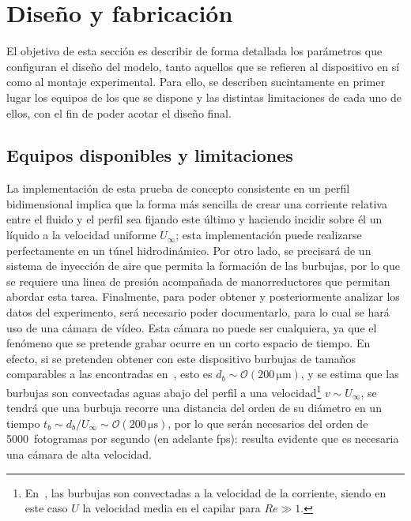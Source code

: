 \section{Diseño y fabricación}

El objetivo de esta sección es describir de forma detallada los parámetros que configuran el diseño del modelo, tanto aquellos que se refieren al dispositivo en sí como al montaje experimental. Para ello, se describen sucintamente en primer lugar los equipos de los que se dispone y las distintas limitaciones de cada uno de ellos, con el fin de poder acotar el diseño final.

\subsection{Equipos disponibles y limitaciones}

La implementación de esta prueba de concepto consistente en un perfil bidimensional implica que la forma más sencilla de crear una corriente relativa entre el fluido y el perfil sea fijando este último y haciendo incidir sobre él un líquido a la velocidad uniforme $U_{\infty}$; esta implementación puede realizarse perfectamente en un túnel hidrodinámico. Por otro lado, se precisará de un sistema de inyección de aire que permita la formación de las burbujas, por lo que se requiere una linea de presión acompañada de manorreductores que permitan abordar esta tarea. Finalmente, para poder obtener y posteriormente analizar los datos  del experimento, será necesario poder documentarlo, para lo cual se hará uso de una cámara de vídeo. Esta cámara no puede ser cualquiera, ya que el fenómeno que se pretende grabar ocurre en un corto espacio de tiempo. En efecto, si se pretenden obtener con este dispositivo burbujas de tamaños comparables a las encontradas en~\cite{Evangelio2015b}, esto es $d_{b}\sim \mathcal{O}\left(200\,\mathrm{\mu m}\right)$, y se estima que las burbujas son convectadas aguas abajo del perfil a una velocidad\footnote{En~\cite{Evngelio2015b}, las burbujas son convectadas a la velocidad de la corriente, siendo en este caso $U$ la velocidad media en el capilar para $Re \gg 1$.} $v \sim U_{\infty}$, se tendrá que una burbuja recorre una distancia del orden de su diámetro en un tiempo $t_{b} \sim d_{b}/U_{\infty} \sim \mathcal{O}\left(200\,\mathrm{\mu s}\right)$, por lo que serán necesarios del orden de 5000~fotogramas por segundo (en adelante fps): resulta evidente que es necesaria una cámara de alta velocidad. 


